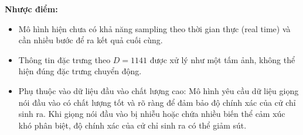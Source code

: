 \textbf{Nhược điểm:}

\begin{itemize}
	\item Mô hình hiện chưa có khả năng sampling theo thời gian thực (real time) và cần nhiều bước để ra kết quả cuối cùng.
	
	\item Thông tin đặc trưng theo $D=1141$ được xử lý như một tấm ảnh, không thể hiện đúng đặc trưng chuyển động.
	
	\item Phụ thuộc vào dữ liệu đầu vào chất lượng cao: Mô hình yêu cầu dữ liệu giọng nói đầu vào có chất lượng tốt và rõ ràng để đảm bảo độ chính xác của cử chỉ sinh ra. Khi giọng nói đầu vào bị nhiễu hoặc chứa nhiều biến thể cảm xúc khó phân biệt, độ chính xác của cử chỉ sinh ra có thể giảm sút.
	
	
	
	
\end{itemize}


%
%

